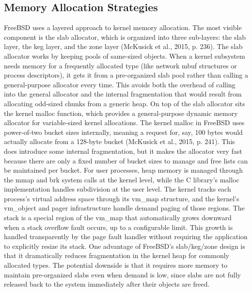 \subsection{Memory Allocation Strategies}
FreeBSD uses a layered approach to kernel memory allocation. The most visible component is the slab allocator, which is organized into three sub-layers: the slab layer, the keg layer, and the zone layer (McKusick et al., 2015, p. 236). The slab allocator works by keeping pools of same-sized objects. When a kernel subsystem needs memory for a frequently allocated type (like network mbuf structures or process descriptors), it gets it from a pre-organized slab pool rather than calling a general-purpose allocator every time. This avoids both the overhead of calling into the general allocator and the internal fragmentation that would result from allocating odd-sized chunks from a generic heap.
On top of the slab allocator sits the kernel malloc function, which provides a general-purpose dynamic memory allocator for variable-sized kernel allocations. The kernel malloc in FreeBSD uses power-of-two bucket sizes internally, meaning a request for, say, 100 bytes would actually allocate from a 128-byte bucket (McKusick et al., 2015, p. 241). This does introduce some internal fragmentation, but it makes the allocator very fast because there are only a fixed number of bucket sizes to manage and free lists can be maintained per bucket.
For user processes, heap memory is managed through the mmap and brk system calls at the kernel level, while the C library's malloc implementation handles subdivision at the user level. The kernel tracks each process's virtual address space through its vm\_map structure, and the kernel's vm\_object and pager infrastructure handle demand paging of those regions. The stack is a special region of the vm\_map that automatically grows downward when a stack overflow fault occurs, up to a configurable limit. This growth is handled transparently by the page fault handler without requiring the application to explicitly resize its stack.
One advantage of FreeBSD's slab/keg/zone design is that it dramatically reduces fragmentation in the kernel heap for commonly allocated types. The potential downside is that it requires more memory to maintain pre-organized slabs even when demand is low, since slabs are not fully released back to the system immediately after their objects are freed.

